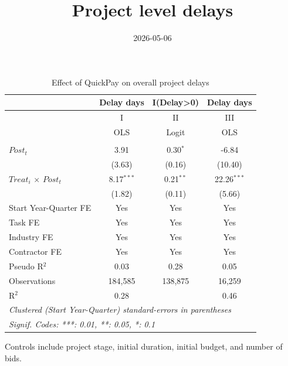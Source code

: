 \documentclass[
]{article}
\title{Project level delays}
\author{}
\date{\vspace{-2.5em}2026-05-06}
\begin{document}
\maketitle

\begin{table}[htbp]
   \caption{Effect of QuickPay on overall project delays}
   \centering
   \small
   \begin{tabular}{lccc}
      \toprule
      \midrule  & Delay days & I(Delay>0) & Delay days\\
      \midrule  & I & II & III\\
                                   &  OLS         & Logit       & OLS\\  
      \midrule \\
      $Post_t$                     & 3.91         & 0.30$^{*}$  & -6.84\\   
                                   & (3.63)       & (0.16)      & (10.40)\\   
      $Treat_i$ $\times$ $Post_t$  & 8.17$^{***}$ & 0.21$^{**}$ & 22.26$^{***}$\\   
                                   & (1.82)       & (0.11)      & (5.66)\\   
      \midrule 
      Start Year-Quarter FE        & Yes          & Yes         & Yes\\  
      Task FE                      & Yes          & Yes         & Yes\\  
      Industry FE                  & Yes          & Yes         & Yes\\  
      Contractor FE                & Yes          & Yes         & Yes\\  
      Pseudo R$^2$                 & 0.03         & 0.28        & 0.05\\  
      Observations                 & 184,585      & 138,875     & 16,259\\  
      R$^2$                        & 0.28         &             & 0.46\\  
      \midrule
      \multicolumn{4}{l}{\emph{Clustered (Start Year-Quarter) standard-errors in parentheses}}\\
      \multicolumn{4}{l}{\emph{Signif. Codes: ***: 0.01, **: 0.05, *: 0.1}}\\
   \end{tabular}
   
   \par \raggedright 
   Controls include project stage, initial duration, initial budget, and number of bids.
\end{table}
\end{document}
